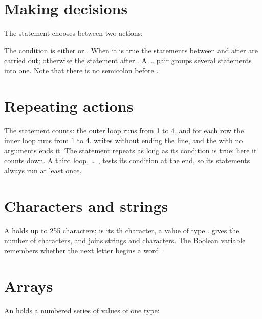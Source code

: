 \section{Making decisions}
The  statement chooses between two actions:



The condition  is either  or .  When
it is true the statements between  and  after 
are carried out; otherwise the statement after .  A
\dots{} pair groups several statements into one.  Note
that there is no semicolon before .

\section{Repeating actions}


The  statement counts: the outer loop runs  from 1 to 4, and
for each row the inner loop runs  from 1 to 4.
 writes without ending the line, and the
 with no arguments ends it.  The  statement
repeats as long as its condition is true; here it counts down.  A third
loop,  \dots{} , tests its condition at the end, so its
statements always run at least once.

\section{Characters and strings}


A  holds up to 255 characters;  is its
th character, a value of type .   gives
the number of characters, and \code{+} joins strings and characters.  The
Boolean variable  remembers whether the next letter begins a
word.

\section{Arrays}
An  holds a numbered series of values of one type:

